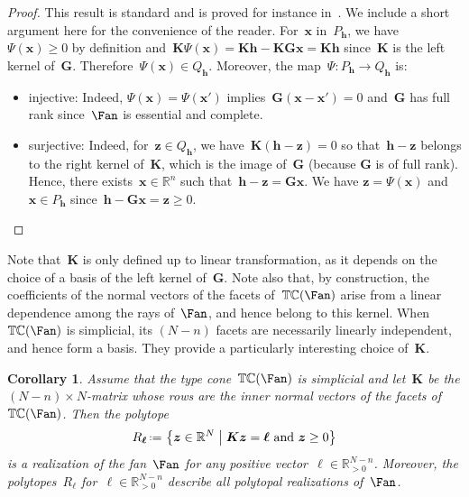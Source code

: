 \documentclass{amsart}
\newtheorem{corollary}[theorem]{Corollary}
\theoremstyle{definition}
\newcommand{\R}{\mathbb{R}} %
\renewcommand{\b}[1]{{\boldsymbol{#1}}} %
\newcommand{\set}[2]{\left\{ #1 \;\middle|\; #2 \right\}} %
\newcommand{\eqdef}{\mbox{\,\raisebox{0.2ex}{\scriptsize\ensuremath{\mathrm:}}\ensuremath{=}\,}} %
\newcommand{\typeCone}{\mathbb{TC}} %
\begin{document}
\begin{proof}
This result is standard and is proved for instance in~\cite[Coro.~9.5.7]{DeLoeraRambauSantos}.
We include a short argument here for the convenience of the reader.
For~$\b{x}$ in~$P_\b{h}$, we have $\Psi(\b{x}) \ge 0$ by definition and~$\b{K}\Psi(\b{x}) = \b{K}\b{h} - \b{K}\b{G}\b{x} = \b{K}\b{h}$ since~$\b{K}$ is the left kernel of~$\b{G}$. Therefore~$\Psi(\b{x}) \in Q_\b{h}$.
Moreover, the map~$\Psi : P_\b{h} \to Q_\b{h}$ is:
\begin{itemize}
\item injective: Indeed, $\Psi(\b{x}) = \Psi(\b{x}')$ implies~$\b{G}(\b{x} - \b{x}') = 0$ and~$\b{G}$ has full rank since~$\Fan$ is essential and complete.
\item surjective: Indeed, for~$\b{z} \in Q_\b{h}$, we have~$\b{K}(\b{h}-\b{z}) = 0$ so that~$\b{h}-\b{z}$ belongs to the right kernel of~$\b{K}$, which is the image of~$\b{G}$ (because $\b{G}$ is of full rank).
Hence, there exists~$\b{x} \in \R^n$ such that~$\b{h}-\b{z} = \b{G}\b{x}$. We have $\b{z} = \Psi(\b{x})$ and~$\b{x} \in P_\b{h}$ since~$\b{h} - \b{G}\b{x} = \b{z} \ge 0$.\qedhere
\end{itemize}
\end{proof}

Note that~$\b{K}$ is only defined up to linear transformation, as it depends on the choice of a basis of the left kernel of~$\b{G}$. Note also that, by construction, the coefficients of the normal vectors of the facets of~$\typeCone(\Fan)$ arise from a linear dependence among the rays of~$\Fan$, and hence belong to this kernel. When~$\typeCone(\Fan)$ is simplicial, its $(N-n)$ facets are necessarily linearly independent, and hence form a basis. They provide a particularly interesting choice of~$\b{K}$.  

\begin{corollary}
\label{coro:simplicialTypeCone}
Assume that the type cone~$\typeCone(\Fan)$ is simplicial and let~$\b{K}$ be the $(N-n) \times N$-matrix whose rows are the inner normal vectors of the facets of~$\typeCone(\Fan)$. Then the polytope
\[
R_\b{\ell} \eqdef \set{\b{z} \in \R^N}{\b{K}\b{z} = \b{\ell} \text{ and } \b{z} \ge 0}
\]
is a realization of the fan~$\Fan$ for any positive vector~$\b{\ell} \in \R_{>0}^{N-n}$.
Moreover, the polytopes~$R_\b{\ell}$ for~$\b{\ell} \in \R_{>0}^{N-n}$ describe all polytopal realizations of~$\Fan$.
\end{corollary}
\end{document}
